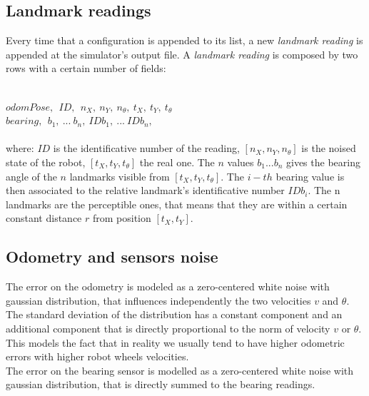 \vspace{1 cm}
\subsection{Landmark readings}
Every time that a configuration is appended to its list, a new \textit{landmark reading} is appended at the simulator's output file.
A \textit{landmark reading} is composed by two rows with a certain number of fields:\\\

$
odomPose, ~~ ID, ~~ n_X, ~ n_Y, ~  n_{\theta}, ~  t_X, ~  t_Y, ~ t_{\theta}
$\\

$
bearing, ~~ b_1, ~ ... ~ b_n, ~ IDb_1, ~ ... ~ IDb_n, 
$\\ \\
where:
\textit{$ID$} is the identificative number of the reading, $[n_X, n_Y, n_{\theta}]$ is the noised state of the robot, $[t_X, t_Y, t_{\theta}]$ the real one.
The $n$ values $ b_1 ... b_n$ gives the bearing angle of the $n$ landmarks visible from $[t_X, t_Y, t_{\theta}]$. The $i-th$ bearing value is then associated to 
the relative landmark's identificative number $IDb_i$.
The n landmarks are the perceptible ones, that means that they are within a certain constant distance $r$ from position $[t_X, t_Y ]$.


\subsection{Odometry and sensors noise}
The error on the odometry is modeled as a zero-centered white noise with gaussian distribution, that influences independently the two velocities $v$ and $\theta$.
The standard deviation of the distribution has a constant component and an additional component that is directly proportional to the norm of velocity $v$ or $\theta$.
This models the fact that in reality we usually tend to have higher odometric errors with higher robot wheels velocities.
\\
The error on the bearing sensor is modelled as a zero-centered white noise with gaussian distribution, that is directly summed to the bearing readings.\\
